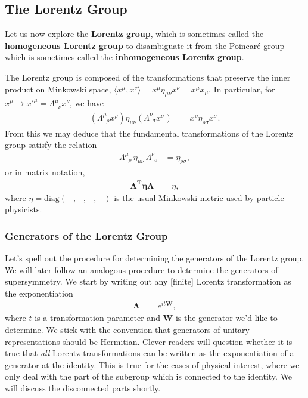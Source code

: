 \documentclass[12pt, oneside]{report}    %
\begin{document}
\subsection{The Lorentz Group}

Let us now explore the \textbf{Lorentz group}, which is sometimes called the \textbf{homogeneous Lorentz group} to disambiguate it from the Poincar\'e group which is sometimes called the \textbf{inhomogeneous Lorentz group}.

The Lorentz group is composed of the transformations that preserve the inner product on Minkowski space, $\langle x^\mu,x^\nu\rangle = x^\mu \eta_{\mu\nu}x^\nu = x^\mu x_\mu$. In particular, for $x^\mu \rightarrow x'^\mu = \Lambda^{\mu}_{\phantom\mu\nu}x^\nu$, we have
\begin{align}
    \left(\Lambda^\mu_{\phantom\mu\rho}x^\rho\right) \eta_{\mu\nu} \left(\Lambda^{\nu}_{\phantom\nu\sigma}x^\sigma\right) &= x^\rho \eta_{\rho\sigma}x^\sigma.
\end{align}
From this we may deduce that the fundamental transformations of the Lorentz group satisfy the relation
\begin{align}
        \Lambda^\mu_{\phantom\mu\rho}\, \eta_{\mu\nu}\, \Lambda^{\nu}_{\phantom\nu\sigma} &= \eta_{\rho\sigma},\label{eq:SUSYalg:lorentzgroup:indices}
\end{align}
or in matrix notation,
\begin{align}
    \mathbf{\Lambda^T\eta\Lambda} &= \eta,\label{eq:SUSYalg:lorentzgroup}
\end{align}
where $\eta = \text{diag}(+,-,-,-)$ is the usual Minkowski metric used by particle physicists.

\subsubsection{Generators of the Lorentz Group}

Let's spell out the procedure for determining the generators of the Lorentz group. We will later follow an analogous procedure to determine the generators of supersymmetry. We start by writing out any [finite] Lorentz transformation as the exponentiation
\begin{align}
    \mathbf{\Lambda} &= e^{i t \mathbf{W}},\label{eq:SUSYalg:lorentz:exp}
\end{align}
where $t$ is a transformation parameter and $\mathbf{W}$ is the generator we'd like to determine. We stick with the convention that generators of unitary representations  should be Hermitian. 
%
Clever readers will question whether it is true that \textit{all} Lorentz transformations can be written as the exponentiation of a generator at the identity. This is true for the cases of physical interest, where we only deal with the part of the subgroup which is connected to the identity. We will discuss the disconnected parts shortly.
\end{document}
